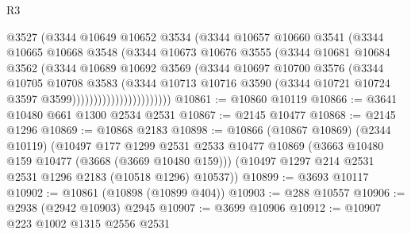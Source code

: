 \begin{lexlean}{R3}
\begin{coremodule}
                              @3527
                              (@3344
                                @10649
                                @10652
                                @3534
                                (@3344
                                  @10657
                                  @10660
                                  @3541
                                  (@3344
                                    @10665
                                    @10668
                                    @3548
                                    (@3344
                                      @10673
                                      @10676
                                      @3555
                                      (@3344
                                        @10681
                                        @10684
                                        @3562
                                        (@3344
                                          @10689
                                          @10692
                                          @3569
                                          (@3344
                                            @10697
                                            @10700
                                            @3576
                                            (@3344
                                              @10705
                                              @10708
                                              @3583
                                              (@3344
                                                @10713
                                                @10716
                                                @3590
                                                (@3344
                                                  @10721
                                                  @10724
                                                  @3597
                                                  @3599)))))))))))))))))))))))
@10861 := @10860 @10119
@10866 := @3641 @10480 @661 @1300 @2534 @2531
@10867 := @2145 @10477
@10868 := @2145 @1296
@10869 := @10868 @2183
@10898 := @10866
    (@10867 @10869)
    (@2344 @10119)
    (@10497
      @177
      @1299
      @2531
      @2533
      @10477
      @10869
      (@3663 @10480 @159 @10477 (@3668 (@3669 @10480 @159)))
      (@10497 @1297 @214 @2531 @2531 @1296 @2183 (@10518 @1296) @10537))
@10899 := @3693 @10117
@10902 := @10861 (@10898 (@10899 @404))
@10903 := @288 @10557
@10906 := @2938 (@2942 @10903) @2945
@10907 := @3699 @10906
@10912 := @10907 @223 @1002 @1315 @2556 @2531

\end{coremodule}
\end{lexlean}
